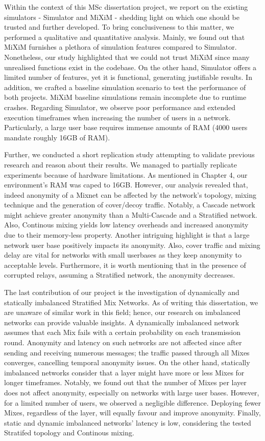\documentclass[logo,msc,cyber]{infthesis}   %
\begin{document}
Within the context of this MSc dissertation project, we report on the existing
simulators\cite{simulator,mixim} - Simulator and MiXiM - shedding light on which one should be
trusted and further developed. To bring conclusiveness to this matter, we
performed a qualitative and quantitative analysis. Mainly, we found out that
MiXiM furnishes a plethora of simulation features compared to Simulator.
Nonetheless, our study highlighted that we could not trust MiXiM since many
unrealised functions exist in the codebase. On the other hand, Simulator offers
a limited number of features, yet it is functional, generating justifiable
results. In addition, we crafted a baseline simulation scenario to test the
performance of both projects. MiXiM baseline simulations remain incomplete due
to runtime crashes. Regarding Simulator, we observe poor performance and
extended execution timeframes when increasing the number of users in a network.
Particularly, a large user base requires immense amounts of RAM (4000 users
mandate roughly 16GB of RAM).

Further, we conducted a short replication study attempting to validate previous
research\cite{piotrowska2021studying,ben2021mixim} and reason about their
results. We managed to partially replicate experiments because of hardware
limitations. As mentioned in Chapter 4, our environment's RAM was caped to 16GB.
However, our analysis revealed that, indeed anonymity of a Mixnet can be
affected by the network's topology, mixing technique and the generation of
cover/decoy traffic. Notably, a Cascade network might achieve greater anonymity
than a Multi-Cascade and a Stratified network. Also, Continous mixing yields low
latency overheads and increased anonymity due to their memory-less property.
Another intriguing highlight is that a large network user base positively
impacts its anonymity. Also, cover traffic and mixing delay are vital for
networks with small userbases as they keep anonymity to acceptable levels.
Furthermore, it is worth mentioning that in the presence of corrupted relays,
assuming a Stratified network, the anonymity decreases. 

The last contribution of our project is the investigation of dynamically and
statically imbalanced Stratified Mix Networks. As of writing this dissertation,
we are unaware of similar work in this field; hence, our research on imbalanced
networks can provide valuable insights. A dynamically imbalanced network assumes
that each Mix fails with a certain probability on each transmission round.
Anonymity and latency on such networks are not affected since after sending and
receiving numerous messages; the traffic passed through all Mixes converges,
cancelling temporal anonymity issues. On the other hand, statically imbalanced
networks consider that a layer might have more or less Mixes for longer
timeframes. Notably, we found out that the number of Mixes per layer does not
affect anonymity, especially on networks with large user bases. However, for a
limited number of users, we observed a negligible difference. Deploying fewer
Mixes, regardless of the layer, will equally favour and improve anonymity.
Finally, static and dynamic imbalanced networks' latency is low, considering the
tested Stratifed topology and Continous mixing.
\end{document}
